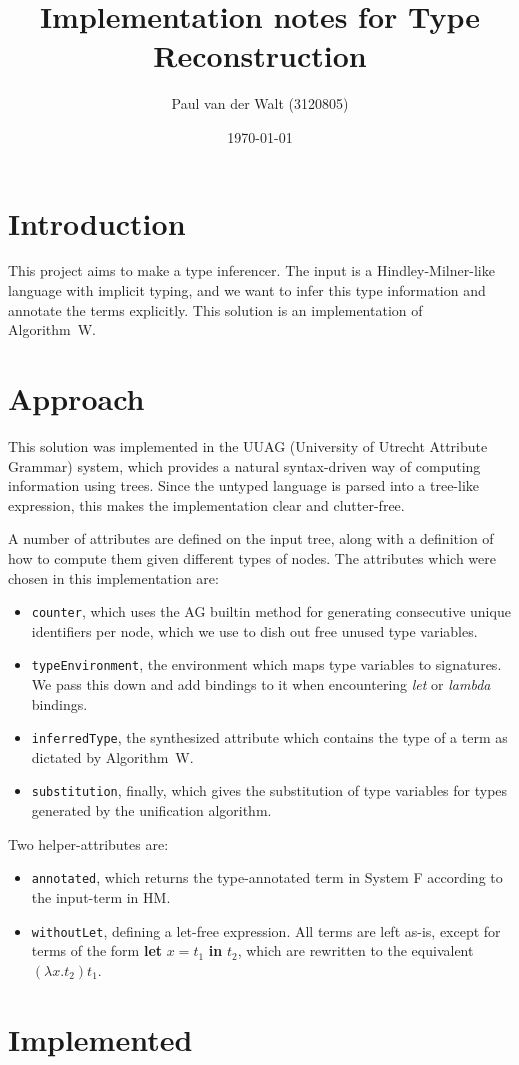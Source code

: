 \documentclass[a4paper]{article}
\author{Paul van der Walt (3120805)}
\date{\today}
\title{Implementation notes for Type Reconstruction}
\begin{document}
\maketitle
\tableofcontents

\section{Introduction}

This project aims to make a type inferencer. The input is a Hindley-Milner-like language with implicit typing, and we want to infer this type information and annotate the terms explicitly. This solution is an implementation of Algorithm~W. 

\section{Approach}

This solution was implemented in the UUAG (University of Utrecht Attribute Grammar) system, which provides a natural syntax-driven way of computing information using trees. Since the untyped language is parsed into a tree-like expression, this makes the implementation clear and clutter-free.

A number of attributes are defined on the input tree, along with a definition of how to compute them given different types of nodes. The attributes which were chosen in this implementation are:

\begin{itemize}
    \item \texttt{counter}, which uses the AG builtin method for generating consecutive unique identifiers per node, which we use to dish out free unused type variables.
    \item \texttt{typeEnvironment}, the environment which maps type variables to signatures. We pass this down and add bindings to it when encountering \emph{let} or \emph{lambda} bindings. 
    \item \texttt{inferredType}, the synthesized attribute which contains the type of a term as dictated by Algorithm~W. 
    \item \texttt{substitution}, finally, which gives the substitution of type variables for types generated by the unification algorithm. 
\end{itemize}

Two helper-attributes are: 

\begin{itemize}
    \item \texttt{annotated}, which returns the type-annotated term in System F according to the input-term in HM.
    \item \texttt{withoutLet}, defining a let-free expression. All terms are left as-is, except for terms of the form \textbf{let} $x = t_1$ \textbf{in} $t_2$, which are rewritten to the equivalent $(\lambda x . t_2) t_1$. 
\end{itemize}




\section{Implemented}
\end{document}
